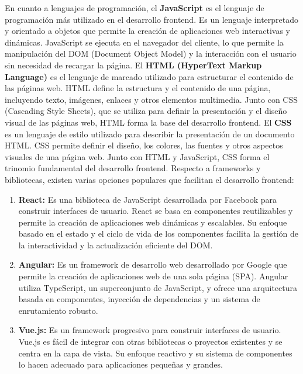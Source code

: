 En cuanto a lenguajes de programación, el \textbf{JavaScript} es el lenguaje de programación más utilizado en el desarrollo frontend. Es un lenguaje interpretado y orientado a objetos que permite la creación de aplicaciones web interactivas y dinámicas. JavaScript se ejecuta en el navegador del cliente, lo que permite la manipulación del DOM (Document Object Model) y la interacción con el usuario sin necesidad de recargar la página.
\newline\newline
El \textbf{HTML (HyperText Markup Language)} es el lenguaje de marcado utilizado para estructurar el contenido de las páginas web. HTML define la estructura y el contenido de una página, incluyendo texto, imágenes, enlaces y otros elementos multimedia. Junto con CSS (Cascading Style Sheets), que se utiliza para definir la presentación y el diseño visual de las páginas web, HTML forma la base del desarrollo frontend.
\newline\newline
El \textbf{CSS} es un lenguaje de estilo utilizado para describir la presentación de un documento HTML. CSS permite definir el diseño, los colores, las fuentes y otros aspectos visuales de una página web. Junto con HTML y JavaScript, CSS forma el trinomio fundamental del desarrollo frontend.
\newline\newline
Respecto a frameworks y bibliotecas, existen varias opciones populares que facilitan el desarrollo frontend:   

\begin{enumerate}
    \item \textbf{React:} Es una biblioteca de JavaScript desarrollada por Facebook para construir interfaces de usuario. React se basa en componentes reutilizables y permite la creación de aplicaciones web dinámicas y escalables. Su enfoque basado en el estado y el ciclo de vida de los componentes facilita la gestión de la interactividad y la actualización eficiente del DOM.
    \item \textbf{Angular:} Es un framework de desarrollo web desarrollado por Google que permite la creación de aplicaciones web de una sola página (SPA). Angular utiliza TypeScript, un superconjunto de JavaScript, y ofrece una arquitectura basada en componentes, inyección de dependencias y un sistema de enrutamiento robusto.
    \item \textbf{Vue.js:} Es un framework progresivo para construir interfaces de usuario. Vue.js es fácil de integrar con otras bibliotecas o proyectos existentes y se centra en la capa de vista. Su enfoque reactivo y su sistema de componentes lo hacen adecuado para aplicaciones pequeñas y grandes.
\end{enumerate}

